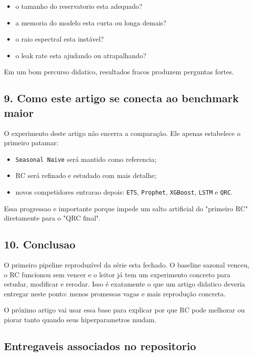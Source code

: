 \documentclass[12pt]{article}
\providecommand{\tightlist}{%
          \setlength{\itemsep}{0pt}\setlength{\parskip}{0pt}}
\begin{document}
\begin{itemize}
\tightlist
\item
  o tamanho do reservatorio esta adequado?
\item
  a memoria do modelo esta curta ou longa demais?
\item
  o raio espectral esta instável?
\item
  o leak rate esta ajudando ou atrapalhando?
\end{itemize}

Em um bom percurso didatico, resultados fracos produzem perguntas fortes.

\subsection{9. Como este artigo se conecta ao benchmark maior}\label{9-como-este-artigo-se-conecta-ao-benchmark-maior}

O experimento deste artigo não encerra a comparação. Ele apenas estabelece o primeiro patamar:

\begin{itemize}
\tightlist
\item
  \texttt{Seasonal\ Naive} será mantido como referencia;
\item
  RC será refinado e estudado com mais detalhe;
\item
  novos competidores entrarao depois: \texttt{ETS}, \texttt{Prophet}, \texttt{XGBoost}, \texttt{LSTM} e \texttt{QRC}.
\end{itemize}

Essa progressao e importante porque impede um salto artificial do "primeiro RC" diretamente para o "QRC final".

\subsection{10. Conclusao}\label{10-conclusao}

O primeiro pipeline reproduzível da série esta fechado. O baseline sazonal venceu, o RC funcionou sem vencer e o leitor já tem um experimento concreto para estudar, modificar e rerodar. Isso é exatamente o que um artigo didatico deveria entregar neste ponto: menos promessas vagas e mais reprodução concreta.

O próximo artigo vai usar essa base para explicar por que RC pode melhorar ou piorar tanto quando seus hiperparametros mudam.

\subsection{Entregaveis associados no repositorio}\label{entregaveis-associados-no-repositorio}
\end{document}
